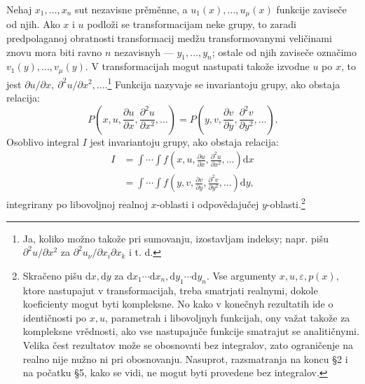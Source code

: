 \documentclass[11pt]{article}
\providecommand{\eps}{\varepsilon}
\providecommand{\p}{\partial}
\providecommand{\dd}{\mathrm d}
\begin{document}
Nehaj \(x_1,\ldots,x_n\) sut nezavisne prěměnne, a \(u_1(x),\ldots,u_\mu(x)\) funkcije zaviseče od njih. Ako \(x\) i \(u\) podloži se transformacijam neke grupy, to zaradi predpolaganoj obratnosti transformacij medžu transformovanymi veličinami znovu mora biti ravno \(n\) nezavisnyh --- \(y_1,\ldots,y_n\); ostale od njih zaviseče označimo \(v_1(y),\ldots,v_\mu(y)\). V transformacijah mogut nastupati takože izvodne \(u\) po \(x\), to jest \(\p u/\p x,\ \p^2u/\p x^2,\ldots\).\footnote{Ja, koliko možno takože pri sumovanju, izostavljam indeksy; napr. pišu \(\p^2u/\p x^2\) za \(\p^2u_\nu/\p x_i\p x_k\) i t. d.} Funkcija nazyvaje se invariantoju grupy, ako obstaja relacija:
\[
P\!\left(x,u,\frac{\p u}{\p x},\frac{\p^2u}{\p x^2},\ldots\right)
 =
P\!\left(y,v,\frac{\p v}{\p y},\frac{\p^2v}{\p y^2},\ldots\right).
\]
Osoblivo integral \(I\) jest invariantoju grupy, ako obstaja relacija:
\begin{equation}
\begin{aligned}
I&=\int\!\cdots\!\int f\!\left(x,u,\frac{\p u}{\p x},\frac{\p^2u}{\p x^2},\ldots\right)\dd x\\
 &=\int\!\cdots\!\int f\!\left(y,v,\frac{\p v}{\p y},\frac{\p^2v}{\p y^2},\ldots\right)\dd y,
\end{aligned}
\tag{1}
\end{equation}
integrirany po libovoljnoj realnoj \(x\)-oblasti i odpovědajučej \(y\)-oblasti.\footnote{Skračeno pišu \(\dd x,\dd y\) za \(\dd x_1\cdots \dd x_n,\dd y_1\cdots \dd y_n\). Vse argumenty \(x,u,\eps,p(x)\), ktore nastupajut v transformacijah, treba smatrjati realnymi, dokole koeficienty mogut byti kompleksne. No kako v konečnyh rezultatih ide o identičnosti po \(x,u\), parametrah i libovoljnyh funkcijah, ony važat takože za kompleksne vrědnosti, ako vse nastupajuče funkcije smatrajut se analitičnymi. Velika čest rezultatov može se obosnovati bez integralov, zato ograničenje na realno nije nužno ni pri obosnovanju. Nasuprot, razsmatranja na koncu \S{}2 i na počatku \S{}5, kako se vidi, ne mogut byti provedene bez integralov.}
\end{document}
